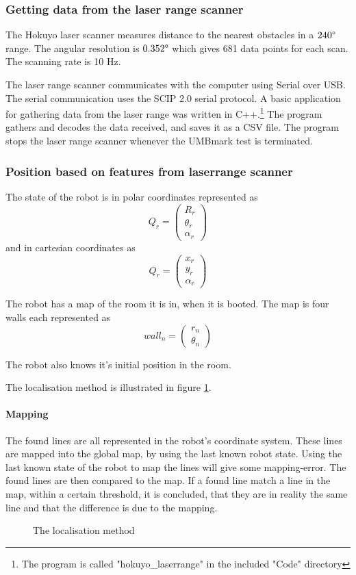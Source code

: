 \subsubsection{Getting data from the laser range scanner}
The Hokuyo laser scanner measures distance to the nearest obstacles in a $240 \degree$ range. The angular resolution is $0.352 \degree$ which gives 681 data points for each scan. The scanning rate is 10 Hz.

The laser range scanner communicates with the computer using Serial over USB. The serial communication uses the SCIP 2.0 serial protocol. 
A basic application for gathering data from the laser range was written in C++.\footnote{The program is called "hokuyo\_laserrange" in the included "Code" directory} 
The program gathers and decodes the data received, and saves it as a CSV file. The program stops the laser range scanner whenever the UMBmark test is terminated.



\subsubsection{Position based on features from laserrange scanner}
The state of the robot is in polar coordinates represented  as 
$$Q_r = \begin{pmatrix}
R_r\\
\theta_r\\
\alpha_r
\end{pmatrix}$$ 
and in cartesian coordinates as 
$$Q_r = \begin{pmatrix}
x_r\\
y_r\\
\alpha_r
\end{pmatrix}$$

The robot has a map of the room it is in, when it is booted. The map 
is four walls each represented as 
$$wall_n = \begin{pmatrix}
r_n\\
\theta_n
\end{pmatrix}
$$

The robot also knows it's initial position in the room.

The localisation method is illustrated in figure \ref{fig:localisation}.

\paragraph*{Mapping}
The found lines are all represented in the robot's coordinate system. These
lines are mapped into the global map, by using the last known robot state. Using 
the last known state of the robot to map the lines will give some mapping-error.
The found lines are then compared to the map. If a found line match a line 
in the map, within a certain threshold, it is concluded, that they are in 
reality the same line and that the difference is due to the mapping.



\begin{figure}
  
  \caption{The localisation method}
  \label{fig:localisation}
\end{figure}


